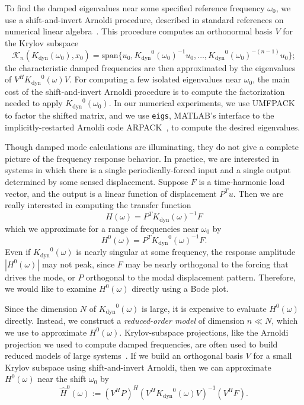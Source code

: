 \documentclass{article}
\newcommand{\sspan}{\mathrm{span}}
\newcommand{\calK}{\ensuremath{\mathcal{K}}}
\newcommand{\Kdynamic}{\ensuremath{K_{\mathrm{dyn}}}}
\begin{document}
To find the damped eigenvalues near some specified reference frequency
$\omega_0$, we use a shift-and-invert Arnoldi procedure, described
in standard references on numerical linear 
algebra~\cite{Golub:1989:MC, Demmel:1997:ANL}.  This procedure computes
an orthonormal basis $V$ for the Krylov subspace
\begin{equation}
  \calK_n(\Kdynamic(\omega_0), x_0) = 
    \sspan\{ u_0, \Kdynamic^0(\omega_0)^{-1} u_0, \ldots,
                  \Kdynamic^0(\omega_0)^{-(n-1)} u_0 \};
\end{equation}
the characteristic damped frequencies are then approximated by the
eigenvalues of $V^H \Kdynamic^0(\omega) V$.  For computing a few
isolated eigenvalues near $\omega_0$, the main cost of the
shift-and-invert Arnoldi procedure is to compute the factorization
needed to apply $\Kdynamic^0(\omega_0)$.  In our numerical
experiments, we use UMFPACK~\cite{Davis:2004:AUU} to factor the
shifted matrix, and we use \texttt{eigs}, MATLAB's interface to the
implicitly-restarted Arnoldi code ARPACK~\cite{Lehoucq:1998:AUG}, to
compute the desired eigenvalues.

Though damped mode calculations are illuminating, they do not give a
complete picture of the frequency response behavior.  In practice, we
are interested in systems in which there is a single
periodically-forced input and a single output determined by some
sensed displacement.  Suppose $F$ is a time-harmonic load vector, and
the output is a linear function of displacement $P^T u$.
Then we are really interested in computing the transfer function
\begin{equation}
  H(\omega) = P^T \Kdynamic(\omega)^{-1} F
\end{equation}
which we approximate for a range of frequencies near $\omega_0$ by
\begin{equation}
  H^0(\omega) = P^T \Kdynamic^0(\omega)^{-1} F.
\end{equation}  
Even if $\Kdynamic^0(\omega)$ is nearly singular at some frequency,
the response amplitude $|H^0(\omega)|$ may not peak, since $F$ may be
nearly orthogonal to the forcing that drives the mode, or $P$
orthogonal to the modal displacement pattern.  Therefore, we would
like to examine $H^0(\omega)$ directly using a Bode plot.

Since the dimension $N$ of $\Kdynamic^0(\omega)$ is large, it is
expensive to evaluate $H^0(\omega)$ directly.  Instead, we construct
a \emph{reduced-order model} of dimension $n \ll N$, which we use to
approximate $H^0(\omega)$.  Krylov-subspace projections, like the
Arnoldi projection we used to compute damped frequencies, are often
used to build reduced models of large
systems~\cite{Bai:2002:KST,Antoulas:2001:ALS}.  If we build an
orthogonal basis $V$ for a small Krylov subspace using
shift-and-invert Arnoldi, then we can approximate $H^0(\omega)$ near the
shift $\omega_0$ by
\begin{equation}
  \hat{H}^0(\omega) := (V^H P)^H (V^H \Kdynamic^0(\omega) V)^{-1} (V^H F).
\end{equation}
\end{document}
